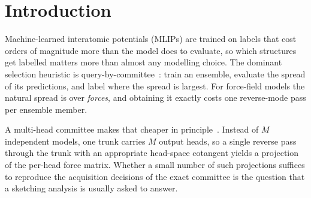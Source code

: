 \begin{abstract}
\noindent
Molecular dynamics with a machine-learned potential requires repeatedly choosing
which structures to label with expensive quantum chemistry. The usual signal is
disagreement among an ensemble of models, and cheap approximations of that signal
are validated by how closely they match the full ensemble. We instead evaluate the
ensemble against the model's actual error, and evaluate cheap approximations of it
separately. Three results follow.

The acquisition rule in common use sums over coordinates, so it grows with molecule
size whether or not the model is uncertain. It is harmless at fixed size and
misleading when sizes vary, where it selects large structures rather than difficult
ones. A deterministic choice of probe directions beats random sampling, skipping
$\fsLOSkipLoPct$--$\fsLOSkipHiPct$\% of the expensive work without changing a
decision. On a realistic materials dataset the magnitude of the predicted
forces---free, already computed---identifies the worst structures as well as the
ensemble does, and the ensemble adds nothing significant on top of it. Ensemble
uncertainty is unnecessary where that free signal suffices, and is the baseline
future methods should be measured against.
\end{abstract}

\section{Introduction}

Machine-learned interatomic potentials (MLIPs) are trained on labels that cost
orders of magnitude more than the model does to evaluate, so which structures get
labelled matters more than almost any modelling choice. The dominant selection
heuristic is query-by-committee~\citep{seung1992query}: train an ensemble,
evaluate the spread of its predictions, and label where the spread is largest.
For force-field models the natural spread is over \emph{forces}, and obtaining it
exactly costs one reverse-mode pass per ensemble member.

A multi-head committee makes that cheaper in
principle~\citep{beck2025committee}. Instead of $M$
independent models, one trunk carries $M$ output heads, so a single reverse pass
through the trunk with an appropriate head-space cotangent yields a projection of
the per-head force matrix. Whether a small number of such projections suffices to
reproduce the acquisition decisions of the exact committee is the question that a
sketching analysis is usually asked to answer.

